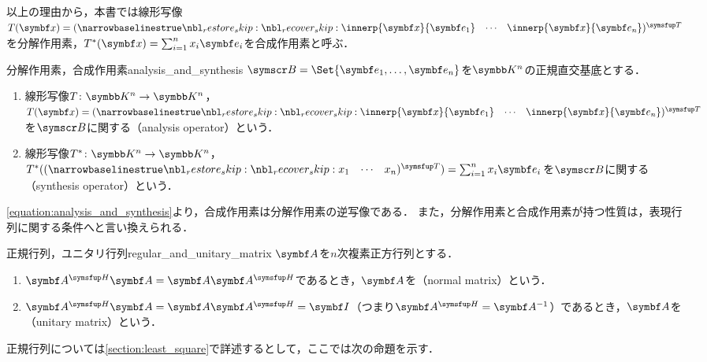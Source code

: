 \documentclass[../../main]{subfiles}
\begin{document}
以上の理由から，本書では線形写像\(T(\vect{x})=\trps{\rowvect{\innerp{\vect{x}}{\vect{e}_1} & \cdots & \innerp{\vect{x}}{\vect{e}_n}}}\)を分解作用素，\(\synth{T}(\vect{x})=\sum_{i=1}^nx_i\vect{e}_i\)を合成作用素と呼ぶ．

\begin{definition}{分解作用素，合成作用素}{analysis_and_synthesis}
  \(\basis{B}=\Set{\vect{e}_1,\dots,\vect{e}_n}\)を\(\numset{K}^n\)の正規直交基底とする．
  \begin{enumerate}
    \item 線形写像\(T\colon\numset{K}^n\to\numset{K}^n\)，\(T(\vect{x})=\trps{\rowvect{\innerp{\vect{x}}{\vect{e}_1} & \cdots & \innerp{\vect{x}}{\vect{e}_n}}}\)を\(\basis{B}\)に関する（analysis operator）という．
    \item 線形写像\(\synth{T}\colon\numset{K}^n\to\numset{K}^n\)，\(\synth{T}(\trps{\rowvect{x_1 & \cdots & x_n}})=\sum_{i=1}^nx_i\vect{e}_i\)を\(\basis{B}\)に関する（synthesis operator）という．
  \end{enumerate}
\end{definition}

\cref{equation:analysis_and_synthesis}より，合成作用素は分解作用素の逆写像である．
また，分解作用素と合成作用素が持つ性質は，表現行列に関する条件へと言い換えられる．

\begin{definition}{正規行列，ユニタリ行列}{regular_and_unitary_matrix}
  \(\mat{A}\)を\(n\)次複素正方行列とする．
  \begin{enumerate}
    \item \(\htrps{\mat{A}}\mat{A}=\mat{A}\htrps{\mat{A}}\)であるとき，\(\mat{A}\)を（normal matrix）という．
    \item \(\htrps{\mat{A}}\mat{A}=\mat{A}\htrps{\mat{A}}=\imat\)（つまり\(\htrps{\mat{A}}=\mat{A}^{-1}\)）であるとき，\(\mat{A}\)を（unitary matrix）という．
  \end{enumerate}
\end{definition}

正規行列については\cref{section:least_square}で詳述するとして，ここでは次の命題を示す．
\end{document}
